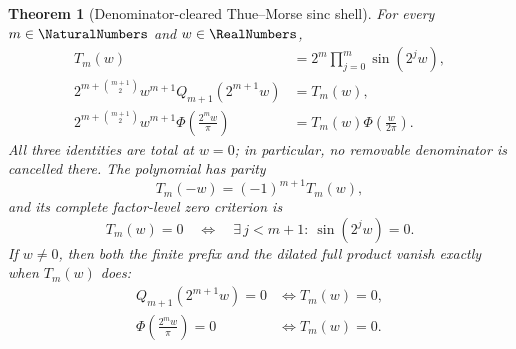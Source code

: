 \documentclass[11pt,oneside]{article}
\newtheorem{theorem}{Theorem}[section]
\theoremstyle{definition}
\theoremstyle{remark}
\begin{document}
\begin{theorem}[Denominator-cleared Thue--Morse sinc shell]
\label{thm:centered-sinc-thue-morse-shell}
For every $m\in\NaturalNumbers$ and $w\in\RealNumbers$,
\begin{align}
 T_m(w)
   &=2^m\prod_{j=0}^{m}\sin(2^jw),                         \label{eq:tm-sine-polynomial-product}\\
 2^{m+\binom{m+1}{2}}w^{m+1}Q_{m+1}(2^{m+1}w)
   &=T_m(w),                                                \label{eq:centered-sinc-cleared-shell}\\
 2^{m+\binom{m+1}{2}}w^{m+1}
   \Phi\!\left(\frac{2^mw}{\pi}\right)
   &=T_m(w)\Phi\!\left(\frac{w}{2\pi}\right).           \label{eq:rvachev-product-thue-morse-shell}
\end{align}
All three identities are total at $w=0$; in particular, no removable denominator is
cancelled there.  The polynomial has parity
\begin{equation}
 T_m(-w)=(-1)^{m+1}T_m(w),                                 \label{eq:tm-sine-polynomial-parity}
\end{equation}
and its complete factor-level zero criterion is
\begin{equation}
 T_m(w)=0
 \quad\Longleftrightarrow\quad
 \exists\,j<m+1:\ \sin(2^jw)=0.                          \label{eq:tm-sine-polynomial-zeros}
\end{equation}
If $w\ne0$, then both the finite prefix and the dilated full product vanish exactly
when $T_m(w)$ does:
\begin{align}
 Q_{m+1}(2^{m+1}w)=0
   &\Longleftrightarrow T_m(w)=0,                           \label{eq:centered-sinc-prefix-zero-iff}\\
 \Phi\!\left(\frac{2^mw}{\pi}\right)=0
   &\Longleftrightarrow T_m(w)=0.                           \label{eq:rvachev-product-zero-iff-tm}
\end{align}
\end{theorem}
\end{document}
